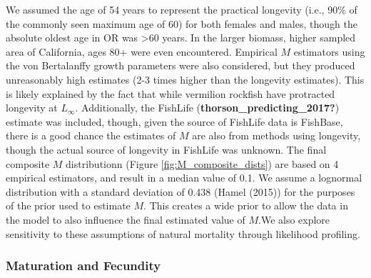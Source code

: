 \documentclass[11pt,
  english,
  a4paper,
]{article}
\begin{document}
We assumed the age of 54 years to represent the practical longevity (i.e., 90\% of the commonly seen maximum age of 60) for both females and males, though the absolute oldest age in OR was \textgreater60 years. In the larger biomass, higher sampled area of California, ages 80+ were even encountered. Empirical {\(M\)\leavevmode\tagmcend\tagstructend} estimators using the von Bertalanffy growth parameters were also considered, but they produced unreasonably high estimates (2-3 times higher than the longevity estimates). This is likely explained by the fact that while vermilion rockfish have protracted longevity at {\(L_{\infty}\)\leavevmode\tagmcend\tagstructend}. Additionally, the FishLife {(\textbf{thorson\_predicting\_2017?})\leavevmode\tagmcend\tagstructend} estimate was included, though, given the source of FishLife data is FishBase, there is a good chance the estimates of {\(M\)\leavevmode\tagmcend\tagstructend} are also from methods using longevity, though the actual source of longevity in FishLife was unknown. The final composite {\(M\)\leavevmode\tagmcend\tagstructend} distributionn (Figure \ref{fig:M_composite_dists}) are based on 4 empirical estimators, and result in a median value of 0.1. We assume a lognormal distribution with a standard deviation of 0.438 ({Hamel (2015)\leavevmode\tagmcend\tagstructend}) for the purposes of the prior used to estimate {\(M\)\leavevmode\tagmcend\tagstructend}. This creates a wide prior to allow the data in the model to also influence the final estimated value of {\(M\)\leavevmode\tagmcend\tagstructend}.We also explore sensitivity to these assumptions of natural mortality through likelihood profiling.

\leavevmode\tagmcend\tagstructend\par


\hypertarget{maturation-and-fecundity}{%
\subsubsection{Maturation and Fecundity}\label{maturation-and-fecundity}}
\end{document}

